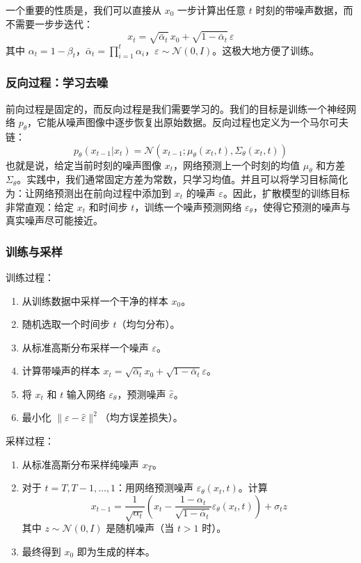 \documentclass[lang=cn,zihao=-4,a4paper,fontset=windows]{beautybook}
\begin{document}
一个重要的性质是，我们可以直接从 \(x_0\) 一步计算出任意 \(t\) 时刻的带噪声数据，而不需要一步步迭代：
\[
x_t = \sqrt{\bar{\alpha}_t} \, x_0 + \sqrt{1 - \bar{\alpha}_t} \, \varepsilon
\]
其中 \(\alpha_t = 1 - \beta_t\)，\(\bar{\alpha}_t = \prod_{i=1}^t \alpha_i\)，\(\varepsilon \sim \mathcal{N}(0, I)\)。这极大地方便了训练。

\subsubsection{反向过程：学习去噪}

前向过程是固定的，而反向过程是我们需要学习的。我们的目标是训练一个神经网络 \(p_\theta\)，它能从噪声图像中逐步恢复出原始数据。反向过程也定义为一个马尔可夫链：
\[
p_\theta(x_{t-1} | x_t) = \mathcal{N}(x_{t-1}; \mu_\theta(x_t, t), \Sigma_\theta(x_t, t))
\]
也就是说，给定当前时刻的噪声图像 \(x_t\)，网络预测上一个时刻的均值 \(\mu_\theta\) 和方差 \(\Sigma_\theta\)。实践中，我们通常固定方差为常数，只学习均值。并且可以将学习目标简化为：让网络预测出在前向过程中添加到 \(x_t\) 的噪声 \(\varepsilon\)。因此，扩散模型的训练目标非常直观：给定 \(x_t\) 和时间步 \(t\)，训练一个噪声预测网络 \(\varepsilon_\theta\)，使得它预测的噪声与真实噪声尽可能接近。

\subsubsection{训练与采样}
训练过程：
\begin{enumerate}
    \item 从训练数据中采样一个干净的样本 \(x_0\)。
    \item 随机选取一个时间步 \(t\)（均匀分布）。
    \item 从标准高斯分布采样一个噪声 \(\varepsilon\)。
    \item 计算带噪声的样本 \(x_t = \sqrt{\bar{\alpha}_t} x_0 + \sqrt{1 - \bar{\alpha}_t} \varepsilon\)。
    \item 将 \(x_t\) 和 \(t\) 输入网络 \(\varepsilon_\theta\)，预测噪声 \(\hat{\varepsilon}\)。
    \item 最小化 \(\|\varepsilon - \hat{\varepsilon}\|^2\)（均方误差损失）。
\end{enumerate}
采样过程：
\begin{enumerate}
\item 从标准高斯分布采样纯噪声 \(x_T\)。
\item 对于 \(t = T, T-1, \dots, 1\)：用网络预测噪声 \(\varepsilon_\theta(x_t, t)\)。计算 \[x_{t-1} = \frac{1}{\sqrt{\alpha_t}} \left( x_t - \frac{1 - \alpha_t}{\sqrt{1 - \bar{\alpha}_t}} \varepsilon_\theta(x_t, t) \right) + \sigma_t z\]其中 \(z \sim \mathcal{N}(0, I)\) 是随机噪声（当 \(t>1\) 时）。
\item 最终得到 \(x_0\) 即为生成的样本。
\end{enumerate}
\end{document}
